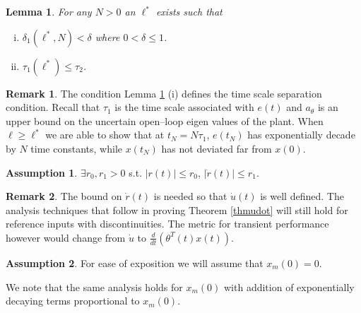 \documentclass[10pt,journal]{IEEEtran}
\theoremstyle{plain}%
\newtheorem{lem}[thm]{Lemma}
\theoremstyle{definition}
\newtheorem{rem}{Remark}
\newtheorem{assm}{Assumption}
\newcommand{\abs}[1]{\left\lvert#1\right\rvert}
\begin{document}
\begin{lem}\label{tscalesep}
For any $N>0$ an $\ell^*$ exists such that
\begin{enumerate}[(i)]
\item $\label{d} \delta_1(\ell^*,N)<\delta$  where $0<\delta\leq1$.
 \item $\tau_1(\ell^*)\leq \tau_2$.
\end{enumerate}
\end{lem}

\begin{rem} The condition Lemma \ref{tscalesep} (i) defines the time scale separation condition. Recall that $\tau_1$ is the time scale associated with $e(t)$ and $a_\theta$ is an upper bound on the uncertain open--loop eigen values of the plant. When $\ell\geq \ell^*$ we are able to show that at $t_N=N\tau_1$, $e(t_N)$ has exponentially decade by $N$ time constants, while $x(t_N)$ has not deviated far from $x(0)$.
\end{rem}

\begin{assm}\label{asst1}
$\exists r_0,r_1>0$ s.t. $ \abs{r(t)}\leq r_0$, ${\abs{\dot r(t)} \leq r_1}$.
\end{assm}
\begin{rem}
The bound on $\dot r(t)$ is needed so that $\dot u(t)$ is well defined. The analysis techniques that follow in proving Theorem \ref{thmudot} will still hold for reference inputs with discontinuities. The metric for transient performance however would change from $\dot u$ to $\frac{d}{dt} \left(\theta^T(t)x(t)\right)$.
\end{rem}





\begin{assm}\label{assxm0}
For ease of exposition we will assume that $ x_m(0)=0.$ \end{assm} We note that the same analysis holds for $x_m(0)$ with addition of exponentially decaying terms proportional to $x_m(0)$.


\end{document}
